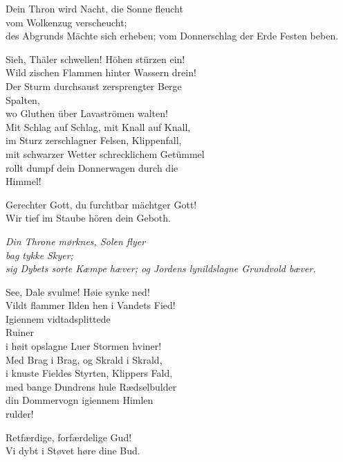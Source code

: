 \documentclass[parskip=full]{scrreprt}
\begin{document}
\clearpage

\begin{multicols}{2}
Dein Thron wird Nacht, die Sonne fleucht\\
vom Wolkenzug verscheucht;\\
des Abgrunds Mächte sich erheben;
vom Donnerschlag der Erde Festen beben.

Sieh, Thäler schwellen! Höhen stürzen ein!\\
Wild zischen Flammen hinter Wassern drein!\\
Der Sturm durchsaust zersprengter Berge\\
\hspace*{1em}Spalten,\\
wo Gluthen über Lavaströmen walten!\\
Mit Schlag auf Schlag, mit Knall auf Knall,\\
im Sturz zerschlagner Felsen, Klippenfall,\\
mit schwarzer Wetter schrecklichem Getümmel\\
rollt dumpf dein Donnerwagen durch die\\
\hspace*{1em}Himmel!

Gerechter Gott, du furchtbar mächtger Gott!\\
Wir tief im Staube hören dein Geboth.

\columnbreak\itshape
Din Throne mørknes, Solen flyer\\
bag tykke Skyer;\\
sig Dybets sorte Kæmpe hæver;
og Jordens lynildslagne Grundvold bæver.

See, Dale svulme! Høie synke ned!\\
Vildt flammer Ilden hen i Vandets Fied!\\
Igiennem vidtadsplittede\\
\hspace*{1em}Ruiner\\
i høit opslagne Luer Stormen hviner!\\
Med Brag i Brag, og Skrald i Skrald,\\
i knuste Fieldes Styrten, Klippers Fald,\\
med bange Dundrens hule Rædselbulder\\
din Dommervogn igiennem Himlen\\
\hspace*{1em}rulder!

Retfærdige, forfærdelige Gud!\\
Vi dybt i Støvet høre dine Bud.
\end{multicols}
\end{document}
